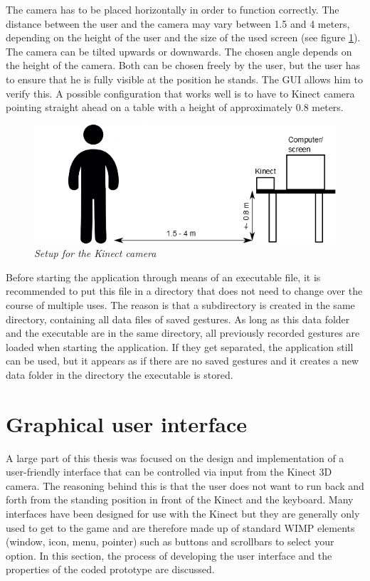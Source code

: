The camera has to be placed horizontally in order to function correctly. The distance between the user and the camera may vary between 1.5 and 4 meters, depending on the height of the user and the size of the used screen (see figure \ref{fig: kinect_setup}). The camera can be tilted upwards or downwards. The chosen angle depends on the height of the camera. Both can be chosen freely by the user, but the user has to ensure that he is fully visible at the position he stands. The GUI allows him to verify this. A possible configuration that works well is to have to Kinect camera pointing straight ahead on a table with a height of approximately 0.8 meters.\\

\begin{figure}[H]
\begin{center}
\includegraphics[width=12cm]{SetupKinect.png}
\caption{\emph{Setup for the Kinect camera}}
\label{fig: kinect_setup}
\end{center}
\end{figure}

Before starting the application through means of an executable file, it is recommended to put this file in a directory that does not need to change over the course of multiple uses. The reason is that a subdirectory is created in the same directory, containing all data files of saved gestures. As long as this data folder and the executable are in the same directory, all previously recorded gestures are loaded when starting the application. If they get separated, the application still can be used, but it appears as if there are no saved gestures and it creates a new data folder in the directory the executable is stored.\\


\section{Graphical user interface}

A large part of this thesis was focused on the design and implementation of a user-friendly interface that can be controlled via input from the Kinect 3D camera. The reasoning behind this is that the user does not want to run back and forth from the standing position in front of the Kinect and the keyboard. Many interfaces have been designed for use with the Kinect but they are generally only used to get to the game and are therefore made up of standard WIMP elements (window, icon, menu, pointer) such as buttons and scrollbars to select your option. In this section, the process of developing the user interface and the properties of the coded prototype are discussed.\\


